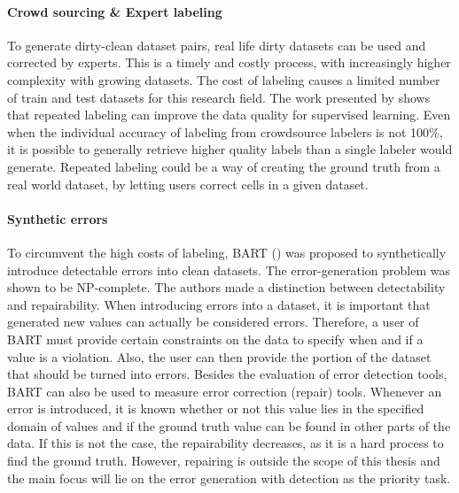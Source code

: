\paragraph{Crowd sourcing \& Expert labeling}
To generate dirty-clean dataset pairs, real life dirty datasets can be used and corrected by experts. This is a timely and costly process, with increasingly higher complexity with growing datasets. The cost of labeling causes a limited number of train and test datasets for this research field.
The work presented by \cite{Sheng2008-gk} shows that repeated labeling can improve the data quality for supervised learning. Even when the individual accuracy of labeling from crowdsource labelers is not 100\%, it is possible to generally retrieve higher quality labels than a single labeler would generate. Repeated labeling could be a way of creating the ground truth from a real world dataset, by letting users correct cells in a given dataset.

\paragraph{Synthetic errors} To circumvent the high costs of labeling, BART (\cite{Arocena2015-om}) was proposed to synthetically introduce detectable errors into clean datasets. The error-generation problem was shown to be NP-complete. The authors made a distinction between detectability and repairability. When introducing errors into a dataset, it is important that generated new values can actually be considered errors. Therefore, a user of BART must provide certain constraints on the data to specify when and if a value is a violation. Also, the user can then provide the portion of the dataset that should be turned into errors. 
Besides the evaluation of error detection tools, BART can also be used to measure error correction (repair) tools. Whenever an error is introduced, it is known whether or not this value lies in the specified domain of values and if the ground truth value can be found in other parts of the data. If this is not the case, the repairability decreases, as it is a hard process to find the ground truth. However, repairing is outside the scope of this thesis and the main focus will lie on the error generation with detection as the priority task. 